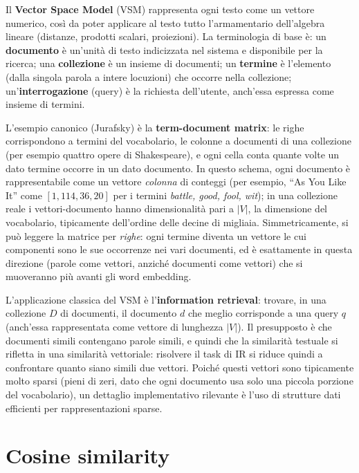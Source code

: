 \documentclass[11pt,a4paper]{report}
\begin{document}
Il \textbf{Vector Space Model} (VSM) rappresenta ogni testo come un vettore numerico, così da poter applicare al testo tutto l'armamentario dell'algebra lineare (distanze, prodotti scalari, proiezioni). La terminologia di base è: un \textbf{documento} è un'unità di testo indicizzata nel sistema e disponibile per la ricerca; una \textbf{collezione} è un insieme di documenti; un \textbf{termine} è l'elemento (dalla singola parola a intere locuzioni) che occorre nella collezione; un'\textbf{interrogazione} (query) è la richiesta dell'utente, anch'essa espressa come insieme di termini.

L'esempio canonico (Jurafsky) è la \textbf{term-document matrix}: le righe corrispondono a termini del vocabolario, le colonne a documenti di una collezione (per esempio quattro opere di Shakespeare), e ogni cella conta quante volte un dato termine occorre in un dato documento. In questo schema, ogni documento è rappresentabile come un vettore \emph{colonna} di conteggi (per esempio, ``As You Like It'' come $[1, 114, 36, 20]$ per i termini \emph{battle, good, fool, wit}); in una collezione reale i vettori-documento hanno dimensionalità pari a $|V|$, la dimensione del vocabolario, tipicamente dell'ordine delle decine di migliaia. Simmetricamente, si può leggere la matrice per \emph{righe}: ogni termine diventa un vettore le cui componenti sono le sue occorrenze nei vari documenti, ed è esattamente in questa direzione (parole come vettori, anziché documenti come vettori) che si muoveranno più avanti gli word embedding.

L'applicazione classica del VSM è l'\textbf{information retrieval}: trovare, in una collezione $D$ di documenti, il documento $d$ che meglio corrisponde a una query $q$ (anch'essa rappresentata come vettore di lunghezza $|V|$). Il presupposto è che documenti simili contengano parole simili, e quindi che la similarità testuale si rifletta in una similarità vettoriale: risolvere il task di IR si riduce quindi a confrontare quanto siano simili due vettori. Poiché questi vettori sono tipicamente molto sparsi (pieni di zeri, dato che ogni documento usa solo una piccola porzione del vocabolario), un dettaglio implementativo rilevante è l'uso di strutture dati efficienti per rappresentazioni sparse.

\section{Cosine similarity}
\end{document}
